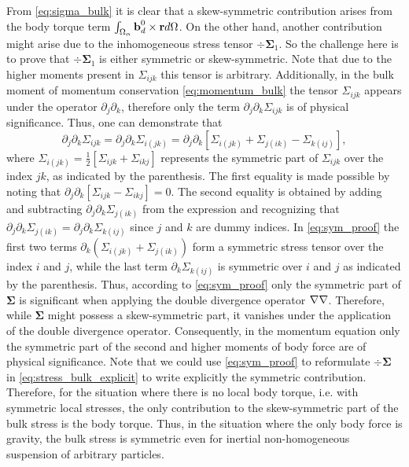 From \ref{eq:sigma_bulk} it is clear that a skew-symmetric contribution arises from the body torque term $\int_{\Omega_{\alpha}} \textbf{b}_d^0 \times \textbf{r} d\Omega$. 
On the other hand, another contribution might arise due to the inhomogeneous stress tensor $\div \bm\Sigma_1$. 
So the challenge here is to prove that  $\div \bm\Sigma_1$ is either symmetric or skew-symmetric. 
Note that due to the higher moments present in $\Sigma_{ijk}$ this tensor is arbitrary. 
Additionally, in the bulk moment of momentum conservation \eqref{eq:momentum_bulk} the tensor $\Sigma_{ijk}$ appears under the operator $\partial_j \partial_k$, therefore only the term $\partial_j \partial_k \Sigma_{ijk}$ is of physical significance. 
Thus, one can demonstrate that \citep{lhuillier1996contribution}
\begin{equation}
    \partial_j \partial_k \Sigma_{ijk}
    = \partial_j \partial_k \Sigma_{i(jk)}
    =
    \partial_j \partial_k \left[
        \Sigma_{i(jk)}
        + \Sigma_{j(ik)}
        - \Sigma_{k(ij)}
    \right],
    \label{eq:sym_proof}
\end{equation}
where $\Sigma_{i(jk)} = \frac{1}{2}[\Sigma_{ijk} + \Sigma_{ikj}]$ represents the symmetric part of $\Sigma_{ijk}$ over the index $jk$, as indicated by the parenthesis. 
The first equality is made possible by noting that $\partial_j \partial_k [\Sigma_{ijk} - \Sigma_{ikj}] = 0$.
The second equality is obtained by adding and subtracting $\partial_j \partial_k \Sigma_{j(ik)}$ from the expression and recognizing that $\partial_j \partial_k \Sigma_{j(ik)} = \partial_j \partial_k \Sigma_{k(ij)}$ since $j$ and $k$ are dummy indices. 
In \ref{eq:sym_proof} the first two terms $\partial_k(\Sigma_{i(jk)} + \Sigma_{j(ik)})$ form a symmetric stress tensor over the index $i$ and $j$, while the last term $\partial_k\Sigma_{k(ij)}$ is symmetric over $i$ and $j$ as indicated by the parenthesis. 
Thus, according to \ref{eq:sym_proof} only the symmetric part of $\bm\Sigma$ is significant when applying the double divergence operator $\mathbf{\nabla}\mathbf{\nabla}$. 
Therefore, while $\bm\Sigma$ might possess a skew-symmetric part, it vanishes under the application of the double divergence operator. 
Consequently, in the momentum equation only the symmetric part of the second and higher moments of body force are of physical significance.
Note that we could use \ref{eq:sym_proof} to reformulate $\div\bm\Sigma$ in \ref{eq:stress_bulk_explicit} to write explicitly the symmetric contribution. 
Therefore, for the situation where there is no local body torque, i.e. with symmetric local stresses,  the only contribution to the skew-symmetric part of the bulk stress is the body torque.
Thus, in the situation where the only body force is gravity, the bulk stress is symmetric even for inertial non-homogeneous suspension of arbitrary particles. 

